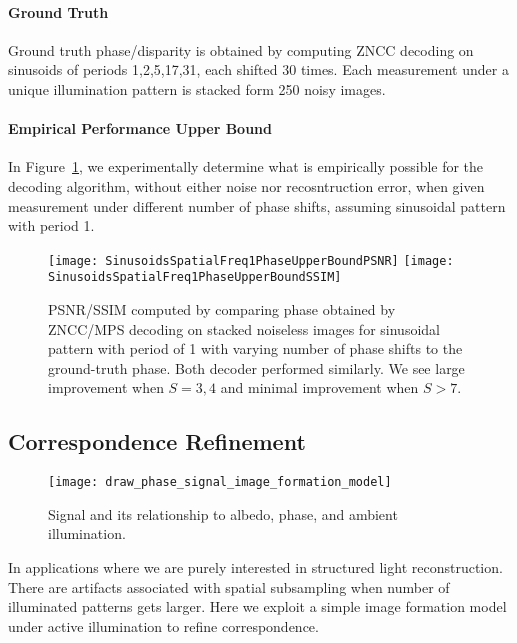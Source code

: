 \documentclass[../writeup.tex]{subfiles}
\begin{document}
\paragraph{Ground Truth} Ground truth phase/disparity is obtained by computing ZNCC decoding on sinusoids of periods 1,2,5,17,31, each shifted 30 times. Each measurement under a unique illumination pattern is stacked form 250 noisy images. 

\paragraph{Empirical Performance Upper Bound} In Figure~\ref{fig:sinusiods_spatial_freq_1_phase_upper_bound_wrt_S}, we experimentally determine what is empirically possible for the decoding algorithm, without either noise nor recosntruction error, when given measurement under different number of phase shifts, assuming sinusoidal pattern with period 1.
\begin{figure}[h!]
    \begin{center}
        \texttt{[image: SinusoidsSpatialFreq1PhaseUpperBoundPSNR]}
        \texttt{[image: SinusoidsSpatialFreq1PhaseUpperBoundSSIM]}
        \caption{PSNR/SSIM computed by comparing phase obtained by ZNCC/MPS decoding on stacked noiseless images for sinusoidal pattern with period of 1 with varying number of phase shifts to the ground-truth phase. Both decoder performed similarly. We see large improvement when $S=3,4$ and minimal improvement when $S>7$.}
        \label{fig:sinusiods_spatial_freq_1_phase_upper_bound_wrt_S}
    \end{center}
\end{figure}  
 
\subsection{Correspondence Refinement}

\begin{figure}[h!]
    \begin{center}
        \texttt{[image: draw\_phase\_signal\_image\_formation\_model]}
        \caption{Signal and its relationship to albedo, phase, and ambient illumination.}
        \label{fig:draw_phase_signal_image_formation_model}
    \end{center}
\end{figure}  

In applications where we are purely interested in structured light reconstruction. There are artifacts associated with spatial subsampling when number of illuminated patterns gets larger. Here we exploit a simple image formation model under active illumination to refine correspondence.
\end{document}
